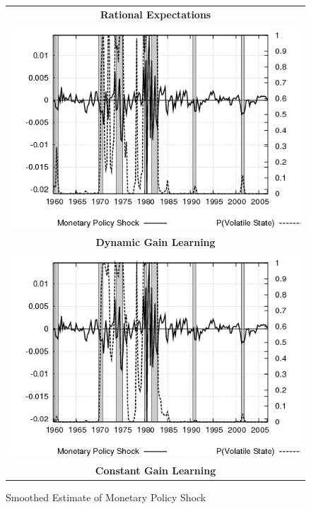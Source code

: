 \begin{figure}[ht]
\begin{center}
\begin{tabular}{c}
\end{tabular}
\end{center}
\end{figure}

\begin{figure}[ht]
\caption{Smoothed Estimate of Monetary Policy Shock}\label{fg3:mpshock}
\begin{center}
\begin{tabular}{c}
\textbf{Rational Expectations} \\  
\includegraphics[scale=0.5]{results_re/mpshock.png} \\
\textbf{Dynamic Gain Learning} \\
\includegraphics[scale=0.5]{results_dg8_wlsinit/mpshock.png} \\
\textbf{Constant Gain Learning} \\

\end{tabular}
\end{center}
\end{figure}
